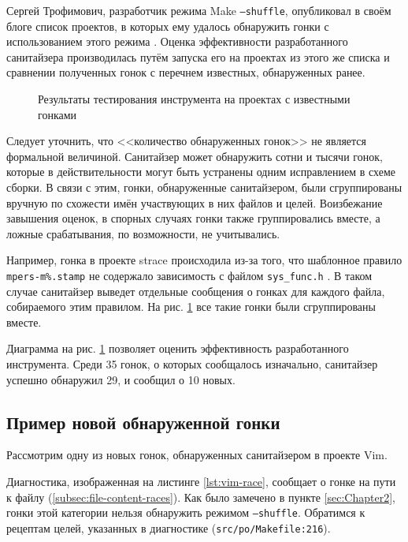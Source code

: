 Сергей Трофимович, разработчик режима Make \texttt{--shuffle}, опубликовал в своём блоге список проектов, в которых ему удалось обнаружить гонки с использованием этого режима \cite{trofi-make-shuffle}. Оценка эффективности разработанного санитайзера производилась путём запуска его на проектах из этого же списка и сравнении полученных гонок с перечнем известных, обнаруженных ранее.

\begin{figure}[H]
    \centering
    
    \caption{Результаты тестирования инструмента на проектах с известными гонками}
    \label{fig:testing-results}
\end{figure}

Следует уточнить, что <<количество обнаруженных гонок>> не является формальной величиной. Санитайзер может обнаружить сотни и тысячи гонок, которые в действительности могут быть устранены одним исправлением в схеме сборки. В связи с этим, гонки, обнаруженные санитайзером, были сгруппированы вручную по схожести имён участвующих в них файлов и целей. Воизбежание завышения оценок, в спорных случаях гонки также группировались вместе, а ложные срабатывания, по возможности, не учитывались.

Например, гонка в проекте strace происходила из-за того, что шаблонное правило \texttt{mpers-m\%.stamp} не содержало зависимость с файлом \texttt{sys\_func.h} \cite{strace-race}. В таком случае санитайзер выведет отдельные сообщения о гонках для каждого файла, собираемого этим правилом. На рис. \ref{fig:testing-results} все такие гонки были сгруппированы вместе.

Диаграмма на рис. \ref{fig:testing-results} позволяет оценить эффективность разработанного инструмента. Среди 35 гонок, о которых сообщалось изначально, санитайзер успешно обнаружил 29, и сообщил о 10 новых.

\subsection{Пример новой обнаруженной гонки}

Рассмотрим одну из новых гонок, обнаруженных санитайзером в проекте Vim.



Диагностика, изображенная на листинге \ref{lst:vim-race}, сообщает о гонке на пути к файлу (\ref{subsec:file-content-races}). Как было замечено в пункте \ref{sec:Chapter2}, гонки этой категории нельзя обнаружить режимом \texttt{--shuffle}. Обратимся к рецептам целей, указанных в диагностике (\texttt{src/po/Makefile:216}).


